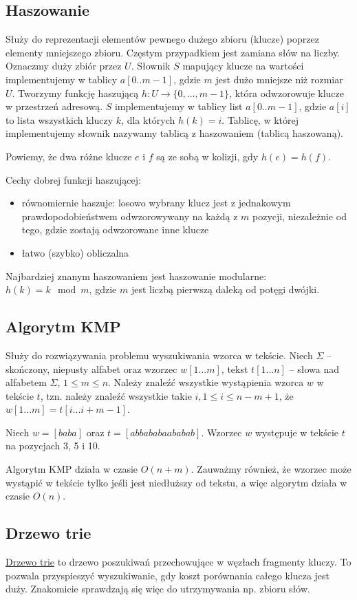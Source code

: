 \subsection{Haszowanie}
Służy do reprezentacji elementów pewnego dużego zbioru (klucze) poprzez elementy mniejszego zbioru. Częstym przypadkiem jest zamiana słów na liczby. Oznaczmy duży zbiór przez $U$. Słownik $S$ mapujący klucze na wartości implementujemy w tablicy $a[0..m-1]$, gdzie $m$ jest dużo mniejsze niż rozmiar $U$. Tworzymy funkcję haszującą $h: U \to \{0, ..., m - 1\}$, która odwzorowuje klucze w przestrzeń adresową. $S$ implementujemy w tablicy list $a[0..m-1]$, gdzie $a[i]$ to lista wszystkich kluczy $k$, dla których $h(k) = i$. Tablicę, w której implementujemy słownik nazywamy tablicą z haszowaniem (tablicą haszowaną).

Powiemy, że dwa różne klucze $e$ i $f$ są ze sobą w kolizji, gdy $h(e) = h(f)$.

Cechy dobrej funkcji haszującej:
\begin{itemize}
    \item równomiernie haszuje: losowo wybrany klucz jest z jednakowym prawdopodobieństwem
odwzorowywany na każdą z $m$ pozycji, niezależnie od tego, gdzie zostają odwzorowane inne klucze
    \item łatwo (szybko) obliczalna
\end{itemize}
Najbardziej znanym haszowaniem jest haszowanie modularne: $h(k) = k \mod m$, gdzie $m$ jest liczbą pierwszą daleką od potęgi dwójki.

\subsection{Algorytm KMP}
Służy do rozwiązywania problemu wyszukiwania wzorca w tekście. Niech $\Sigma$ – skończony, niepusty alfabet oraz wzorzec $w[1...m]$, tekst $t[1...n]$ – słowa nad alfabetem $\Sigma$, $1 \leq m \leq n$. Należy znaleźć wszystkie wystąpienia wzorca $w$ w tekście $t$, tzn. należy znaleźć wszystkie takie $i, 1 \leq i \leq n - m + 1$, że $w[1...m] = t[i...i + m - 1]$.
\begin{example}
    Niech $w = [baba]$ oraz $t = [abbababaababab]$. Wzorzec $w$ występuje w tekście $t$ na pozycjach 3, 5 i 10.
\end{example}
Algorytm KMP działa w czasie $O(n + m)$. Zauważmy również, że wzorzec może wystąpić w tekście tylko jeśli jest niedłuższy od tekstu, a więc algorytm działa w czasie $O(n)$.

\subsection{Drzewo trie}
\href{https://pl.wikipedia.org/wiki/Drzewo_trie}{Drzewo trie} to drzewo poszukiwań przechowujące w węzłach fragmenty kluczy. To pozwala przyspieszyć wyszukiwanie, gdy koszt porównania całego klucza jest duży. Znakomicie sprawdzają się więc do utrzymywania np. zbioru słów.

